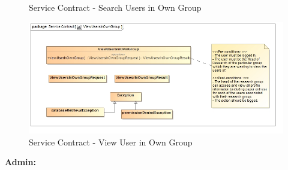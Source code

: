 \documentclass{article}
\begin{document}
\begin{itemize}
\begin{itemize}
\begin{figure}[H]
							\caption{Service Contract - Search Users in Own Group}
						\end{figure}
						\begin{figure}[H]
							\includegraphics[width=\linewidth]{../Diagrams/ServiceContracts/User subsystem/ViewUsersInOwnGroup.jpg}
							\caption{Service Contract - View User in Own Group}
						\end{figure}
					\end{itemize}
				\end{itemize}
				
				\cleardoublepage
				\textbf{Admin:}
				
\end{document}

